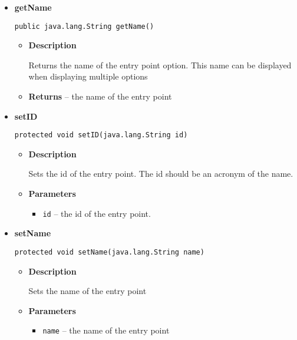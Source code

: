 {{{{{{{{{{{{{\begin{itemize}
{\begin{itemize}
{The id of an entry point should be an acronym of it's name.
}
\item{{\bf  Returns} -- 
the id 
}%
\end{itemize}
}%
\item{ 
{\bf  getName}\\
\begin{lstlisting}[frame=none]
public java.lang.String getName()\end{lstlisting} %
\begin{itemize}
\item{
{\bf  Description}

Returns the name of the entry point option. This name can be displayed when displaying multiple options
}
\item{{\bf  Returns} -- 
the name of the entry point 
}%
\end{itemize}
}%
\item{ 
{\bf  setID}\\
\begin{lstlisting}[frame=none]
protected void setID(java.lang.String id)\end{lstlisting} %
\begin{itemize}
\item{
{\bf  Description}

Sets the id of the entry point. The id should be an acronym of the name.
}
\item{
{\bf  Parameters}
  \begin{itemize}
   \item{
\texttt{id} -- the id of the entry point.}
  \end{itemize}
}%
\end{itemize}
}%
\item{ 
{\bf  setName}\\
\begin{lstlisting}[frame=none]
protected void setName(java.lang.String name)\end{lstlisting} %
\begin{itemize}
\item{
{\bf  Description}

Sets the name of the entry point
}
\item{
{\bf  Parameters}
  \begin{itemize}
   \item{
\texttt{name} -- the name of the entry point}
  \end{itemize}
}%
\end{itemize}
}%
\end{itemize}
}
}
}}}}}}}}}}}
